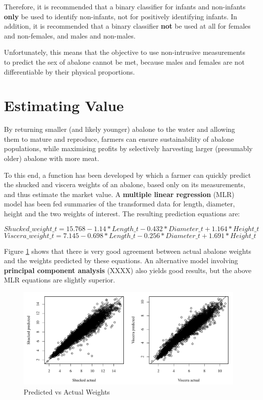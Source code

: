 \documentclass[11pt, a4paper]{article}
\begin{document}
    Therefore, it is recommended that a binary classifier for infants and non-infants \textbf{only} be used to identify non-infants, not for positively identifying infants. In addition, it is recommended that a binary classifier \textbf{not} be used at all for females and non-females, and males and non-males.

    Unfortunately, this means that the objective to use non-intrusive measurements to predict the sex of abalone cannot be met, because males and females are not differentiable by their physical proportions.

    \section{Estimating Value}

    By returning smaller (and likely younger) abalone to the water and allowing them to mature and reproduce, farmers can ensure sustainability of abalone populations, while maximising profits by selectively harvesting larger (presumably older) abalone with more meat.

    To this end, a function has been developed by which a farmer can quickly predict the shucked and viscera weights of an abalone, based only on its measurements, and thus estimate the market value. A \textbf{multiple linear regression} (MLR) model has been fed summaries of the transformed data for length, diameter, height and the two weights of interest. The resulting prediction equations are:

    $$ Shucked\_weight\_t = 15.768 - 1.14*Length\_t - 0.432*Diameter\_t + 1.164*Height\_t $$
    $$ Viscera\_weight\_t = 7.145 - 0.698*Length\_t - 0.256*Diameter\_t + 1.691*Height\_t $$

    Figure \ref{mlr} shows that there is very good agreement between actual abalone weights and the weights predicted by these equations. An alternative model involving \textbf{principal component analysis} (XXXX) also yields good results, but the above MLR equations are slightly superior.

    \begin{figure}[hbt!]
        \centering
        \includegraphics[width=\textwidth]{3.2.pdf}
        \caption{Predicted vs Actual Weights}
        \label{mlr}
    \end{figure}
\end{document}
